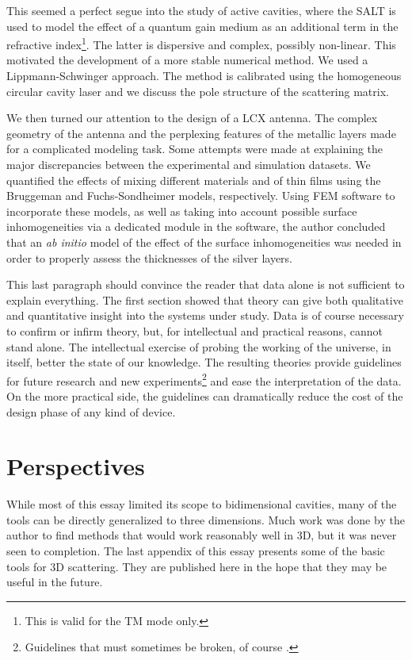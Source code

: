 This seemed a perfect segue into the study of active cavities, where
the SALT is used to model the effect of a quantum gain medium as
an additional term in the refractive index\footnote{This is valid for the TM
mode only.}. The latter is dispersive and complex, possibly non-linear.
This motivated the development of a more stable numerical method. 
We used a Lippmann-Schwinger approach. The method is calibrated using
the homogeneous circular cavity laser and we discuss the pole structure
of the scattering matrix.

We then turned our attention to the design of a LCX antenna. The complex
geometry of the antenna and the perplexing features of the metallic
layers made for a complicated modeling task. Some attempts were made
at explaining the major discrepancies between the experimental
and simulation datasets. We quantified the effects of mixing
different materials and of thin films using the Bruggeman
and Fuchs-Sondheimer models, respectively. Using FEM software
to incorporate these models, as well as taking into account
possible surface inhomogeneities via a dedicated module in the
software, the author concluded that an \textit{ab initio}
model of the effect of the surface inhomogeneities was needed
in order to properly assess the thicknesses of the silver layers.

This last paragraph should convince the reader that data alone is 
not sufficient to explain everything. The first section showed that
theory can give both qualitative and quantitative insight into
the systems under study. Data is of course necessary to confirm 
or infirm theory, but, for intellectual and practical reasons, cannot
stand alone. The intellectual exercise of probing the working of the 
universe, in itself, better the state of our knowledge. The resulting
theories provide guidelines for future research and new experiments\footnote{
Guidelines that must sometimes be broken, of course \cite{KUH1996}.}
and ease the interpretation of the data. On the more practical side, the 
guidelines can dramatically reduce the cost of the design phase of 
any kind of device. 

\section{Perspectives}
While most of this essay limited its scope to bidimensional cavities, 
many of the tools can be directly generalized to three dimensions. Much
work was done by the author to find methods that would work reasonably
well in 3D, but it was never seen to completion. The last appendix of this
essay presents some of the basic tools for 3D scattering. They are published
here in the hope that they may be useful in the future. 

